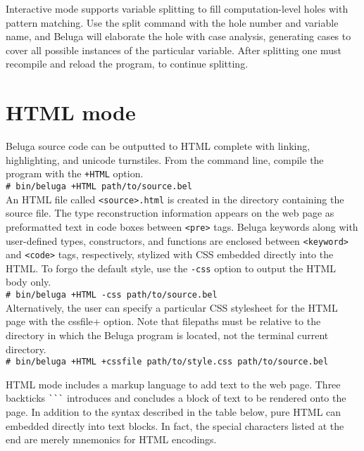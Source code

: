 \documentclass[11pt]{article}
\newcommand{\shellcmd}[1]{\\\indent\texttt{\# #1}\\}
\begin{document}
Interactive mode supports variable splitting to fill computation-level holes with pattern matching.
Use the split command with the hole number and variable name, and Beluga will elaborate the hole with case analysis, generating cases to cover all possible instances of the particular variable.
After splitting one must recompile and reload the program, to continue splitting.


\section{HTML mode}

Beluga source code can be outputted to HTML complete with linking, highlighting, and unicode turnstiles.
From the command line, compile the program with the \texttt{+HTML} option.
\shellcmd{bin/beluga +HTML path/to/source.bel}
An HTML file called \verb+<source>.html+ is created in the directory containing the source file.
The type reconstruction information appears on the web page as preformatted text in code boxes between \verb+<pre>+ tags.
Beluga keywords along with user-defined types, constructors, and functions are enclosed between \verb+<keyword>+ and \verb+<code>+ tags, respectively, stylized with CSS embedded directly into the HTML.
To forgo the default style, use the \verb+-css+ option to output the HTML body only.
\shellcmd{bin/beluga +HTML -css path/to/source.bel}
Alternatively, the user can specify a particular CSS stylesheet for the HTML page with the \verb++cssfile+ option.
Note that filepaths must be relative to the directory in which the Beluga program is located, not the terminal current directory.
\shellcmd{bin/beluga +HTML +cssfile path/to/style.css path/to/source.bel}

\newpage

HTML mode includes a markup language to add text to the web page.
Three backticks \verb+```+ introduces and concludes a block of text to be rendered onto the page.
In addition to the syntax described in the table below, pure HTML can embedded directly into text blocks.
In fact, the special characters listed at the end are merely mnemonics for HTML encodings.
\end{document}
